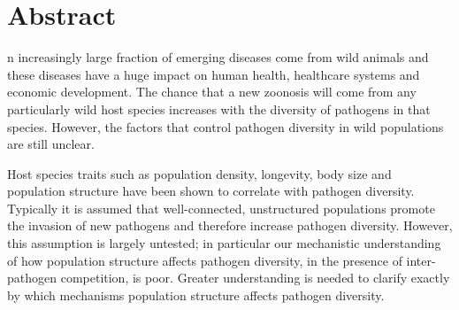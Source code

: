 
\clearpage









\section{Abstract}


n increasingly large fraction of emerging diseases come from wild animals and these diseases have a huge impact on human health, healthcare systems and economic development.
The chance that a new zoonosis will come from any particularly wild host species increases with the diversity of pathogens in that species.
However, the factors that control pathogen diversity in wild populations are still unclear.




Host species traits such as population density, longevity, body size and population structure have been shown to correlate with pathogen diversity.
Typically it is assumed that well-connected, unstructured populations promote the invasion of new pathogens and therefore increase pathogen diversity. %
However, this assumption is largely untested; in particular our mechanistic understanding of how population structure affects pathogen diversity, in the presence of inter-pathogen competition, is poor.
Greater understanding is needed to clarify exactly by which mechanisms population structure affects pathogen diversity. 



